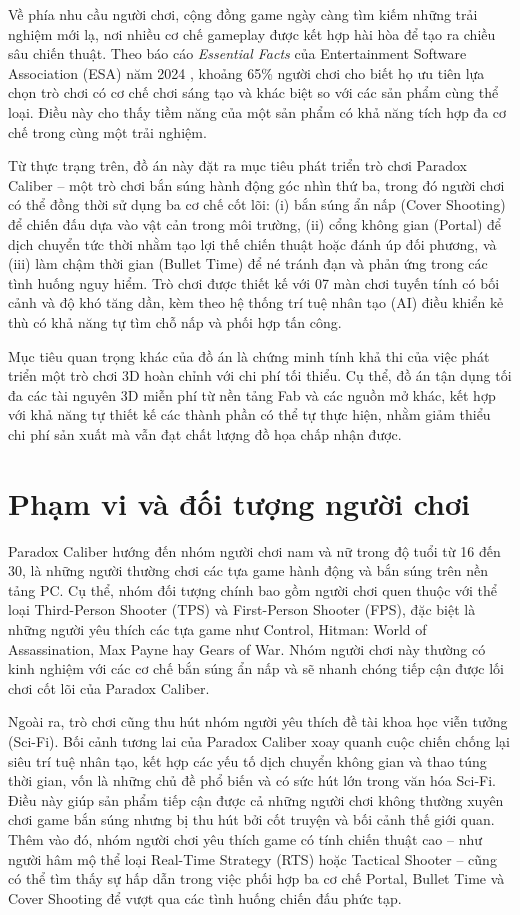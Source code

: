 \documentclass[../DoAn.tex]{subfiles}
\begin{document}
Về phía nhu cầu người chơi, cộng đồng game ngày càng tìm kiếm những trải nghiệm mới lạ, nơi nhiều cơ chế gameplay được kết hợp hài hòa để tạo ra chiều sâu chiến thuật. Theo báo cáo \textit{Essential Facts} của Entertainment Software Association (ESA) năm 2024 \cite{ESA2024}, khoảng 65\% người chơi cho biết họ ưu tiên lựa chọn trò chơi có cơ chế chơi sáng tạo và khác biệt so với các sản phẩm cùng thể loại. Điều này cho thấy tiềm năng của một sản phẩm có khả năng tích hợp đa cơ chế trong cùng một trải nghiệm.

Từ thực trạng trên, đồ án này đặt ra mục tiêu phát triển trò chơi Paradox Caliber -- một trò chơi bắn súng hành động góc nhìn thứ ba, trong đó người chơi có thể đồng thời sử dụng ba cơ chế cốt lõi: (i) bắn súng ẩn nấp (Cover Shooting) để chiến đấu dựa vào vật cản trong môi trường, (ii) cổng không gian (Portal) để dịch chuyển tức thời nhằm tạo lợi thế chiến thuật hoặc đánh úp đối phương, và (iii) làm chậm thời gian (Bullet Time) để né tránh đạn và phản ứng trong các tình huống nguy hiểm. Trò chơi được thiết kế với 07 màn chơi tuyến tính có bối cảnh và độ khó tăng dần, kèm theo hệ thống trí tuệ nhân tạo (AI) điều khiển kẻ thù có khả năng tự tìm chỗ nấp và phối hợp tấn công.

Mục tiêu quan trọng khác của đồ án là chứng minh tính khả thi của việc phát triển một trò chơi 3D hoàn chỉnh với chi phí tối thiểu. Cụ thể, đồ án tận dụng tối đa các tài nguyên 3D miễn phí từ nền tảng Fab và các nguồn mở khác, kết hợp với khả năng tự thiết kế các thành phần có thể tự thực hiện, nhằm giảm thiểu chi phí sản xuất mà vẫn đạt chất lượng đồ họa chấp nhận được.

\section{Phạm vi và đối tượng người chơi}
\label{section:1.3}

Paradox Caliber hướng đến nhóm người chơi nam và nữ trong độ tuổi từ 16 đến 30, là những người thường chơi các tựa game hành động và bắn súng trên nền tảng PC. Cụ thể, nhóm đối tượng chính bao gồm người chơi quen thuộc với thể loại Third-Person Shooter (TPS) và First-Person Shooter (FPS), đặc biệt là những người yêu thích các tựa game như Control, Hitman: World of Assassination, Max Payne hay Gears of War. Nhóm người chơi này thường có kinh nghiệm với các cơ chế bắn súng ẩn nấp và sẽ nhanh chóng tiếp cận được lối chơi cốt lõi của Paradox Caliber.

Ngoài ra, trò chơi cũng thu hút nhóm người yêu thích đề tài khoa học viễn tưởng (Sci-Fi). Bối cảnh tương lai của Paradox Caliber xoay quanh cuộc chiến chống lại siêu trí tuệ nhân tạo, kết hợp các yếu tố dịch chuyển không gian và thao túng thời gian, vốn là những chủ đề phổ biến và có sức hút lớn trong văn hóa Sci-Fi. Điều này giúp sản phẩm tiếp cận được cả những người chơi không thường xuyên chơi game bắn súng nhưng bị thu hút bởi cốt truyện và bối cảnh thế giới quan. Thêm vào đó, nhóm người chơi yêu thích game có tính chiến thuật cao -- như người hâm mộ thể loại Real-Time Strategy (RTS) hoặc Tactical Shooter -- cũng có thể tìm thấy sự hấp dẫn trong việc phối hợp ba cơ chế Portal, Bullet Time và Cover Shooting để vượt qua các tình huống chiến đấu phức tạp.
\end{document}
